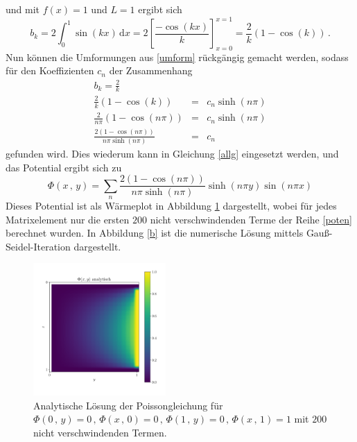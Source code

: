 und mit $f(x)=1$ und $L=1$ ergibt sich
\begin{equation}
b_k=2\int_0^1 \sin\left(kx\right)\,\mathrm{d}x
=2\left[\frac{-\cos\left(kx\right)}{k}\right]_{x=0}^{x=1}
=\frac{2}{k}\left(1-\cos\left(k\right)\right)\,.
\end{equation}
Nun können die Umformungen aus \eqref{umform} rückgängig gemacht werden, sodass für den Koeffizienten $c_n$ der Zusammenhang
\begin{eqnarray}
b_k=\frac{2}{k}\\\frac{2}{k}\left(1-\cos\left(k\right)\right)&=&c_n\sinh\left(n\pi\right)\\
\frac{2}{n\pi}\left(1-\cos\left(n\pi\right)\right)&=&c_n\sinh\left(n\pi\right)\\
\frac{2\left(1-\cos\left(n\pi\right)\right)}{n\pi\sinh\left(n\pi\right)}
&=&c_n
\end{eqnarray}
gefunden wird. Dies wiederum kann in Gleichung \eqref{allg} eingesetzt werden, und das Potential ergibt sich zu 
\begin{equation}
\Phi\left(x\,,\,y\right)
=
\sum_n 
\frac{2\left(1-\cos\left(n\pi\right)\right)}{n\pi\sinh\left(n\pi\right)}
\sinh\left(n\pi y\right)
\sin\left(n\pi x\right)\label{poten}
\end{equation}
Dieses Potential ist als Wärmeplot in Abbildung \ref{ana} dargestellt, wobei für jedes Matrixelement nur die ersten $200$ nicht verschwindenden Terme der Reihe \eqref{poten} berechnet wurden. In Abbildung \ref{b} ist die numerische Lösung mittels Gauß-Seidel-Iteration dargestellt.
 \begin{figure}[H]
\centering 
\includegraphics[width=0.45\textwidth]{Abbildungen/Phi_b_ana.pdf}
\caption{Analytische Lösung der Poissongleichung für $\Phi\left(0\,,\,y\right)=0\,,\,
\Phi\left(x\,,\,0\right)=0\,,\,
\Phi\left(1\,,\,y\right)=0\,,\,
\Phi\left(x\,,\,1\right)=1$ mit $200$ nicht verschwindenden Termen.}
\label{ana}
\end{figure}\noindent
